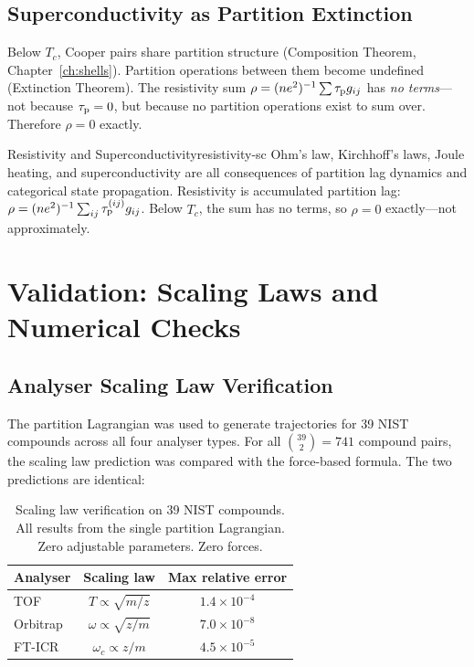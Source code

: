 \subsection{Superconductivity as Partition Extinction}

\begin{theorem}[Superconductivity]
  Below $T_c$, Cooper pairs share partition structure (Composition Theorem,
  Chapter~\ref{ch:shells}).  Partition operations between them become
  undefined (Extinction Theorem).  The resistivity sum
  $\rho = (ne^2)^{-1}\sum\tau_{\mathrm{p}} g_{ij}$ has \emph{no terms}---not because
  $\tau_{\mathrm{p}} = 0$, but because no partition operations exist to sum over.
  Therefore $\rho = 0$ exactly.
\end{theorem}

\begin{consequence}{Resistivity and Superconductivity}{resistivity-sc}
  Ohm's law, Kirchhoff's laws, Joule heating, and superconductivity are all
  consequences of partition lag dynamics and categorical state propagation.
  Resistivity is accumulated partition lag:
  $\rho = (ne^2)^{-1}\sum_{ij}\tau_{\mathrm{p}}^{(ij)}g_{ij}$.  Below $T_c$, the
  sum has no terms, so $\rho = 0$ exactly---not approximately.
\end{consequence}

\section{Validation: Scaling Laws and Numerical Checks}
\label{sec:ch21-validation}

\subsection{Analyser Scaling Law Verification}

The partition Lagrangian was used to generate trajectories for 39 NIST
compounds across all four analyser types.  For all $\binom{39}{2} = 741$
compound pairs, the scaling law prediction was compared with the
force-based formula.  The two predictions are identical:

\begin{table}[htbp]
\centering
\caption{Scaling law verification on 39 NIST compounds.  All results from
  the single partition Lagrangian.  Zero adjustable parameters.  Zero forces.}
\label{tab:ch21-validation}
\begin{tabular}{@{}lcc@{}}
\toprule
\textbf{Analyser} & \textbf{Scaling law} & \textbf{Max relative error} \\
\midrule
TOF         & $T \propto \sqrt{m/z}$      & $1.4 \times 10^{-4}$ \\
Orbitrap    & $\omega \propto \sqrt{z/m}$ & $7.0 \times 10^{-8}$ \\
FT-ICR      & $\omega_c \propto z/m$      & $4.5 \times 10^{-5}$ \\
\bottomrule
\end{tabular}
\end{table}

